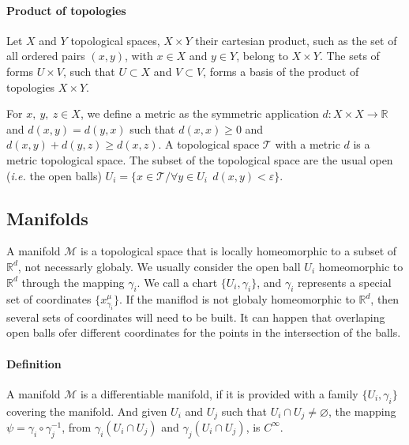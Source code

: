\documentclass[final, paper=letter,5p,times,twocolumn]{elsarticle}
\theoremstyle{definition}
\begin{document}
\paragraph{Product of topologies}{Let $X$ and $Y$ topological spaces, $X \times Y$ their cartesian product, such as the set of all ordered pairs $(x,y)$, with $x\in X$ and $y\in Y$, belong to $X\times Y$. The sets of forms $U\times V$, such that $U\subset X$ and $V\subset V$, forms a basis of the product of topologies $X \times Y$. }

For $x,~y,~z \in X$, we define a metric as the symmetric application $d : X \times X \rightarrow \mathbb{R}$ and $d(x,y) = d(y,x)$ such that $d(x,x) \ge 0$ and $d(x,y) + d(y,z) \ge d(x,z)$. A topological space $\mathcal{T}$ with a metric $d$ is a metric topological space. The subset of the topological space are the usual open ({\it i.e.} the open balls) $U_{i} = \{ x \in \mathcal{T} / \forall y \in U_{i} ~~ d(x,y) < \varepsilon \}$.
  
\subsection{Manifolds}

A manifold $\mathcal{M}$ is a topological space that is locally homeomorphic to a subset of $\mathbb{R}^{d}$, not necessarly globaly. We usually consider the open ball $U_{i}$ homeomorphic to $\mathbb{R}^{d}$ through the mapping $\gamma_{i}$. We call a chart $\{U_{i}, \gamma_{i}\}$, and $\gamma_{i}$ represents a special set of coordinates $\{x_{\gamma_{i}}^{\mu}\}$. If the maniflod is not globaly homeomorphic to $\mathbb{R}^{d}$, then several sets of coordinates will need to be built. It can happen that overlaping open balls ofer different coordinates for the points in the intersection of the balls.

\paragraph{Definition}{A manifold $\mathcal{M}$ is a differentiable manifold, if it is provided with a family $\{U_{i}, \gamma_{i}\}$ covering the manifold. And given $U_{i}$ and $U_{j}$ such that $U_{i} \cap U_{j} \ne \varnothing$, the mapping $\psi = \gamma_{i} \circ \gamma_{j}^{-1}$, from $\gamma_{i}(U_{i} \cap U_{j})$ and $\gamma_{j}(U_{i} \cap U_{j})$, is $C^{\infty}$.}

\end{document}
